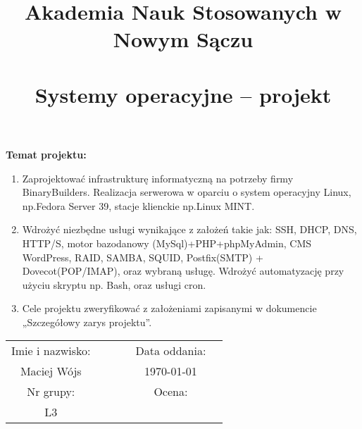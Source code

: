 \documentclass[a4paper]{article}
\title{\textbf{Akademia Nauk Stosowanych w Nowym Sączu}\\\smaller{Wydział Nauk Inżynieryjnych}\vspace*{1em} \\ \textbf{Systemy operacyjne – projekt}\vspace*{0.5em}\\\smaller{studia stacjonarne\\semestr letni 2023/2024}}
\author{}
\date{}
\begin{document}
\maketitle

\textbf{Temat projektu:}
\begin{enumerate}
      \item Zaprojektować infrastrukturę informatyczną na potrzeby firmy BinaryBuilders. Realizacja
      serwerowa w oparciu o system operacyjny Linux, np.\@ Fedora Server 39, stacje klienckie
      np.\@ Linux MINT. %

    \item Wdrożyć niezbędne usługi wynikające z założeń takie jak: SSH, DHCP, DNS, HTTP/S,
          motor bazodanowy (MySql)+PHP+phpMyAdmin, CMS WordPress, RAID, SAMBA,
          SQUID, Postfix(SMTP) + Dovecot(POP/IMAP), oraz wybraną usługę. Wdrożyć %
          automatyzację przy użyciu skryptu np. Bash, oraz usługi cron.
    \item Cele projektu zweryfikować z założeniami zapisanymi w dokumencie „Szczegółowy
          zarys projektu”.
\end{enumerate}

\renewcommand{\arraystretch}{1.25}
\setlength{\tabcolsep}{12pt}

\begin{table}[h!]
    \centering
    \begin{tabular}{cccccc}
    Imie i nazwisko: &&&& Data oddania: \\
    Maciej Wójs &&&& \today \\
    Nr grupy: &&&& Ocena: \\
    L3 &  \\
    \end{tabular}
\end{table}

\newpage
\tableofcontents
\newpage
\listoffigures
\newpage
\end{document}
